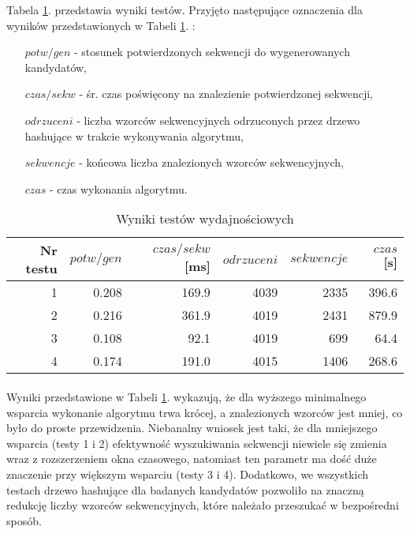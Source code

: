 \documentclass[11pt,a4paper]{article}
\begin{document}
Tabela \ref{tab:2}. przedstawia wyniki testów. Przyjęto następujące oznaczenia dla wyników przedstawionych w Tabeli \ref{tab:2}. :
\begin{itemize}
\item[$potw\slash gen$ - ]stosunek potwierdzonych sekwencji do wygenerowanych kandydatów,
\item[$czas\slash sekw$ - ]śr. czas poświęcony na znalezienie potwierdzonej sekwencji,
\item[$odrzuceni$ - ]liczba wzorców sekwencyjnych odrzuconych przez drzewo hashujące w trakcie wykonywania algorytmu,
\item[$sekwencje$ - ]końcowa liczba znalezionych wzorców sekwencyjnych,
\item[$czas$ - ]czas wykonania algorytmu.
\end{itemize}
\begin{table}[!hbt]
\caption{Wyniki testów wydajnościowych}
\centering
\begin{tabular}{|r|r|r|r|r|r|}
\hline
Nr testu	& $potw\slash gen$	& $czas\slash sekw$ [ms]	& $odrzuceni$	& $sekwencje$	& $czas$ [s]\\[1.2ex]\hline
1			& 0.208				& 169.9						& 4039			& 2335			& 396.6		\\[1ex]\hline
2			& 0.216				& 361.9						& 4019			& 2431			& 879.9		\\[1ex]\hline
3			& 0.108				& 92.1						& 4019			& 699			& 64.4		\\[1ex]\hline
4			& 0.174				& 191.0						& 4015			& 1406			& 268.6		\\[1ex]\hline
\end{tabular}
\label{tab:2}
\end{table}


\paragraph{}Wyniki przedstawione w Tabeli \ref{tab:2}. wykazują, że dla wyższego minimalnego wsparcia wykonanie algorytmu trwa krócej, a znalezionych wzorców jest mniej, co było do proste przewidzenia. Niebanalny wniosek jest taki, że dla mniejszego wsparcia (testy 1 i 2) efektywność wyszukiwania sekwencji niewiele się zmienia wraz z rozszerzeniem okna czasowego, natomiast ten parametr ma dość duże znaczenie przy większym wsparciu (testy 3 i 4). Dodatkowo, we wszystkich testach drzewo hashujące dla badanych kandydatów pozwoliło na znaczną redukcję liczby wzorców sekwencyjnych, które należało przeszukać w bezpośredni sposób. 
\end{document}
